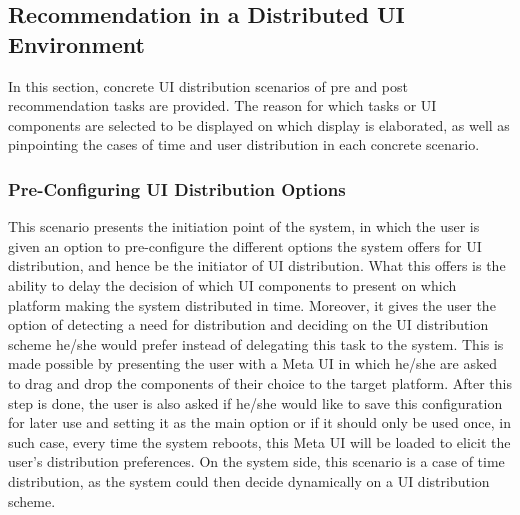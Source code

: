 \subsection{Recommendation in a Distributed UI Environment}
In this section, concrete UI distribution scenarios of pre and post recommendation tasks are provided. The reason for which tasks or UI components are selected to be displayed on which display is elaborated, as well as pinpointing the cases of time and user distribution in each concrete scenario.

\subsubsection{Pre-Configuring UI Distribution Options}
This scenario presents the initiation point of the system, in which the user is given an option to pre-configure the different options the system offers for UI distribution, and hence be the initiator of UI distribution. What this offers is the ability to delay the decision of which UI components to present on which platform making the system distributed in time. Moreover, it gives the user the option of detecting a need for distribution and deciding on the UI distribution scheme he/she would prefer instead of delegating this task to the system. This is made possible by presenting the user with a Meta UI in which he/she are asked to drag and drop the components of their choice to the target platform. After this step is done, the user is also asked if he/she would like to save this configuration for later use and setting it as the main option or if it should only be used once, in such case, every time the system reboots, this Meta UI will be loaded to elicit the user's distribution preferences. On the system side, this scenario is a case of time distribution, as the system could then decide dynamically on a UI distribution scheme.  

